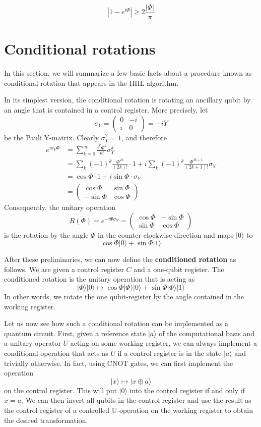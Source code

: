 \documentclass[a4paper, draft]{article}
\theoremstyle{own}
\theoremstyle{remark}
\begin{document}
$$
| 1- e^{i\Phi}|   \geq 2 \frac{|\Phi|}{\pi}
$$


\section{Conditional rotations}\label{app:conditionalrotations}

In this section, we will summarize a few basic facts about a procedure known as conditional rotation that appears in the HHL algorithm. 

In its simplest version, the conditional rotation is rotating an ancillary qubit by an angle that is contained in a control register. More precisely, let 
$$
\sigma_Y = \begin{pmatrix} 0 & -i \\ i & 0 \end{pmatrix} = -iY
$$
be the Pauli Y-matrix. Clearly $\sigma_Y^2 = 1$, and therefore
\begin{align*}
e^{i\sigma_Y \Phi} &= \sum_{k=0}^\infty \frac{i^k \Phi^k}{k!} \sigma_Y^k \\
&= 
\sum_k (-1)^k \frac{\Phi^{2k}}{(2k)!} \cdot 1 
+ 
i \sum_k (-1)^k \frac{\Phi^{2k+1}}{(2k+1)!} \sigma_Y \\
&= \cos \Phi \cdot 1 + i \sin \Phi \cdot \sigma_Y \\
&= \begin{pmatrix} \cos \Phi & \sin \Phi \\ - \sin \Phi & \cos \Phi \end{pmatrix}
\end{align*}
Consequently, the unitary operation
$$
R(\Phi) = e^{-i\Phi \sigma_Y} = \begin{pmatrix} \cos \Phi & - \sin \Phi \\  \sin \Phi & \cos \Phi \end{pmatrix}
$$
is the rotation by the angle $\Phi$ in the counter-clockwise direction and maps $|0 \rangle $ to
$$
\cos \Phi |0 \rangle + \sin \Phi |1 \rangle
$$

After these preliminaries, we can now define the {\bf conditioned rotation} as follows. We are given a control register $C$ and a one-qubit register. The conditioned rotation is the unitary operation that is acting as
$$
|\Phi \rangle |0 \rangle \mapsto \cos \Phi  |\Phi \rangle   |0 \rangle + \sin \Phi |\Phi \rangle |1 \rangle 
$$
In other words, we rotate the one qubit-register by the angle contained in the working register.

Let us now see how such a conditional rotation can be implemented as a quantum circuit. First, given a reference state $|a \rangle$ of the computational basis and a unitary operator $U$ acting on some working register, we can always implement a conditional operation that acts as $U$ if a control register is in the state $|a \rangle$ and trivially otherwise. In fact, using CNOT gates, we can first implement the operation
$$
|x \rangle \mapsto |x \oplus a \rangle
$$
on the control register. This will put $|0 \rangle$ into the control register if and only if $x = a$. We can then invert all qubits in the control register and use the result as the control register of a controlled U-operation on the working register to obtain the desired transformation.
\end{document}
